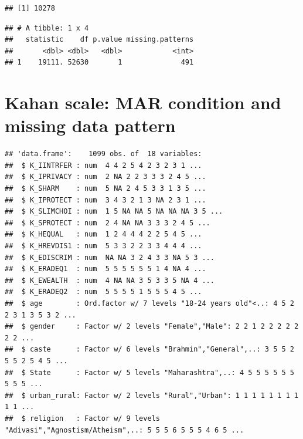 \documentclass[
]{article}
\begin{document}
\begin{verbatim}
## [1] 10278
\end{verbatim}

\begin{verbatim}
## # A tibble: 1 x 4
##   statistic    df p.value missing.patterns
##       <dbl> <dbl>   <dbl>            <int>
## 1    19111. 52630       1              491
\end{verbatim}

\hypertarget{kahan-scale-mar-condition-and-missing-data-pattern}{%
\section{Kahan scale: MAR condition and missing data
pattern}\label{kahan-scale-mar-condition-and-missing-data-pattern}}

\begin{verbatim}
## 'data.frame':    1099 obs. of  18 variables:
##  $ K_IINTRFER : num  4 4 2 5 4 2 3 2 3 1 ...
##  $ K_IPRIVACY : num  2 NA 2 2 3 3 3 2 4 5 ...
##  $ K_SHARM    : num  5 NA 2 4 5 3 3 1 3 5 ...
##  $ K_IPROTECT : num  3 4 3 2 1 3 NA 2 3 1 ...
##  $ K_SLIMCHOI : num  1 5 NA NA 5 NA NA NA 3 5 ...
##  $ K_SPROTECT : num  2 4 NA NA 3 3 3 2 4 5 ...
##  $ K_HEQUAL   : num  1 2 4 4 4 2 2 5 4 5 ...
##  $ K_HREVDIS1 : num  5 3 3 2 2 3 3 4 4 4 ...
##  $ K_EDISCRIM : num  NA NA 3 2 4 3 3 NA 5 3 ...
##  $ K_ERADEQ1  : num  5 5 5 5 5 5 1 4 NA 4 ...
##  $ K_EWEALTH  : num  4 NA NA 3 5 3 3 5 NA 4 ...
##  $ K_ERADEQ2  : num  5 5 5 5 1 5 5 5 4 5 ...
##  $ age        : Ord.factor w/ 7 levels "18-24 years old"<..: 4 5 2 2 3 1 3 5 3 2 ...
##  $ gender     : Factor w/ 2 levels "Female","Male": 2 2 1 2 2 2 2 2 2 2 ...
##  $ caste      : Factor w/ 6 levels "Brahmin","General",..: 3 5 5 2 5 5 2 5 4 5 ...
##  $ State      : Factor w/ 5 levels "Maharashtra",..: 4 5 5 5 5 5 5 5 5 5 ...
##  $ urban_rural: Factor w/ 2 levels "Rural","Urban": 1 1 1 1 1 1 1 1 1 1 ...
##  $ religion   : Factor w/ 9 levels "Adivasi","Agnostism/Atheism",..: 5 5 5 6 5 5 5 4 6 5 ...
\end{verbatim}
\end{document}
